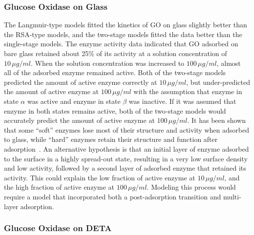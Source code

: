 \subsubsection{Glucose Oxidase on Glass}

The Langmuir-type models fitted the kinetics of GO on glass slightly
better than the RSA-type models, and the two-stage models fitted the
data better than the single-stage models. The enzyme activity data
indicated that GO adsorbed on bare glass retained about 25\% of its
activity at a solution concentration of $10\,\mu g/ml$. When the
solution concentration was increased to $100\,\mu g/ml$, almost all
of the adsorbed enzyme remained active. Both of the two-stage models
predicted the amount of active enzyme correctly at $10\,\mu g/ml$,
but under-predicted the amount of active enzyme at $100\,\mu g/ml$
with the assumption that enzyme in state $\alpha$ was active and
enzyme in state $\beta$ was inactive. If it was assumed that enzyme
in both states remains active, both of the two-stage models would
accurately predict the amount of active enzyme at $100\,\mu g/ml$.
It has been shown that some {}``soft'' enzymes lose most of their
structure and activity when adsorbed to glass, while {}``hard''
enzymes retain their structure and function after adsorption~\cite{Zoungrana1997,Welzel2002}.
An alternative hypothesis is that an initial layer of enzyme adsorbed
to the surface in a highly spread-out state, resulting in a very low
surface density and low activity, followed by a second layer of adsorbed
enzyme that retained its activity. This could explain the low fraction
of active enzyme at $10\,\mu g/ml$, and the high fraction of active
enzyme at $100\,\mu g/ml$. Modeling this process would require a
model that incorporated both a post-adsorption transition and multi-layer
adsorption.


\subsubsection{Glucose Oxidase on DETA}

